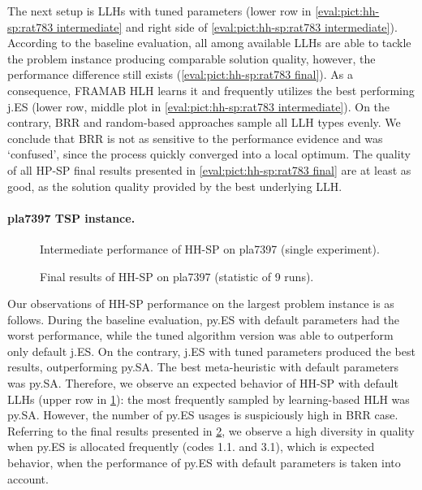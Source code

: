 The next setup is LLHs with tuned parameters (lower row in \cref{eval:pict:hh-sp:rat783 intermediate} and right side of \cref{eval:pict:hh-sp:rat783 intermediate}). According to the baseline evaluation, all among available LLHs are able to tackle the problem instance producing comparable solution quality, however, the performance difference still exists (\cref{eval:pict:hh-sp:rat783 final}). As a consequence, FRAMAB HLH learns it and frequently utilizes the best performing j.ES (lower row, middle plot in \cref{eval:pict:hh-sp:rat783 intermediate}). On the contrary, BRR and random-based approaches sample all LLH types evenly. We conclude that BRR is not as sensitive to the performance evidence and was `confused', since the process quickly converged into a local optimum. The quality of all HP-SP final results presented in \cref{eval:pict:hh-sp:rat783 final} are at least as good, as the solution quality provided by the best underlying LLH.

\paragraph{pla7397 TSP instance.}
\begin{figure}[t]
	\centering
	\vspace{-20pt}
	
	\caption{Intermediate performance of HH-SP on pla7397 (single experiment).}
	\vspace{-10pt}
	\label{eval:pict:hh-sp:pla7397 intermediate}
\end{figure}

\begin{figure}[b]
	\centering
	\vspace{-20pt}
	
	\caption{Final results of HH-SP on pla7397 (statistic of 9 runs).}
	\vspace{-5pt}
	\label{eval:pict:hh-sp:pla7397 final}
\end{figure}
Our observations of HH-SP performance on the largest problem instance is as follows. During the baseline evaluation, py.ES with default parameters had the worst performance, while the tuned algorithm version was able to outperform only default j.ES. On the contrary, j.ES with tuned parameters produced the best results, outperforming py.SA. The best meta-heuristic with default parameters was py.SA. Therefore, we observe an expected behavior of HH-SP with default LLHs (upper row in \cref{eval:pict:hh-sp:pla7397 intermediate}): the most frequently sampled by learning-based HLH was py.SA. However, the number of py.ES usages is suspiciously high in BRR case. Referring to the final results presented in \cref{eval:pict:hh-sp:pla7397 final}, we observe a high diversity in quality when py.ES is allocated frequently (codes 1.1. and 3.1), which is expected behavior, when the performance of py.ES with default parameters is taken into account.

